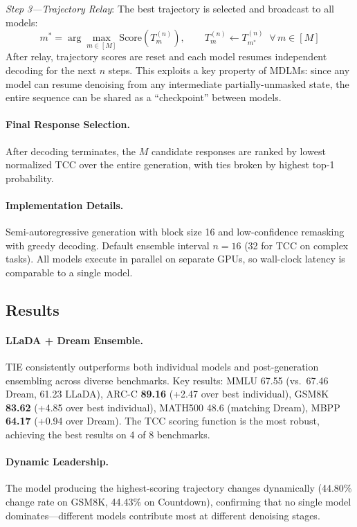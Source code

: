 \documentclass[11pt,a4paper]{article}
\begin{document}
\emph{Step 3---Trajectory Relay}: The best trajectory is selected and broadcast to all models:
\begin{equation}
m^* = \arg\max_{m \in [M]} \mathrm{Score}(T_m^{(n)}), \qquad T_m^{(n)} \leftarrow T_{m^*}^{(n)} \;\;\forall\, m \in [M]
\end{equation}
After relay, trajectory scores are reset and each model resumes independent decoding for the next $n$ steps. This exploits a key property of MDLMs: since any model can resume denoising from any intermediate partially-unmasked state, the entire sequence can be shared as a ``checkpoint'' between models.

\paragraph{Final Response Selection.} After decoding terminates, the $M$ candidate responses are ranked by lowest normalized TCC over the entire generation, with ties broken by highest top-1 probability.

\paragraph{Implementation Details.} Semi-autoregressive generation with block size 16 and low-confidence remasking with greedy decoding. Default ensemble interval $n=16$ (32 for TCC on complex tasks). All models execute in parallel on separate GPUs, so wall-clock latency is comparable to a single model.

\subsection{Results}

\paragraph{LLaDA + Dream Ensemble.} TIE consistently outperforms both individual models and post-generation ensembling across diverse benchmarks. Key results: MMLU 67.55 (vs.\ 67.46 Dream, 61.23 LLaDA), ARC-C \textbf{89.16} (+2.47 over best individual), GSM8K \textbf{83.62} (+4.85 over best individual), MATH500 48.6 (matching Dream), MBPP \textbf{64.17} (+0.94 over Dream). The TCC scoring function is the most robust, achieving the best results on 4 of 8 benchmarks.

\paragraph{Dynamic Leadership.} The model producing the highest-scoring trajectory changes dynamically (44.80\% change rate on GSM8K, 44.43\% on Countdown), confirming that no single model dominates---different models contribute most at different denoising stages.
\end{document}
